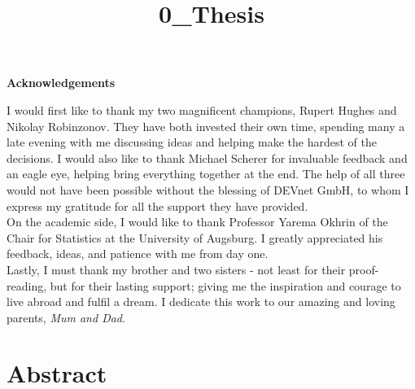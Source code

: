 \documentclass{article}
\date{}
\title{0\_Thesis}
\begin{document}
\maketitle
\pagebreak


\vspace{5cm}

\Large  

\noindent
\textbf{Acknowledgements}

\normalsize
\vspace{13mm}

\noindent
I would first like to thank my two magnificent champions, Rupert Hughes and Nikolay Robinzonov. They have both invested their own time, spending many a late evening with me discussing ideas and helping make the hardest of the decisions. I would also like to thank Michael Scherer for invaluable feedback and an eagle eye, helping bring everything together at the end. The help of all three would not have been possible without the blessing of DEVnet GmbH, to whom I express my gratitude for all the support they have provided.\\

\vspace{5mm}
\noindent
On the academic side, I would like to thank Professor Yarema Okhrin of the Chair for Statistics at the University of Augsburg. I greatly appreciated his feedback, ideas, and patience with me from day one.\\


\vspace{5mm}
\noindent
Lastly, I must thank my brother and two sisters - not least for their proof-reading, but for their lasting support; giving me the inspiration and courage to live abroad and fulfil a dream. I dedicate this work to our amazing and loving parents, \emph{Mum and Dad}.


\pagebreak

\pagebreak


\pagebreak


\section{Abstract}
\label{sec-1}

\vspace{10mm}
\end{document}
